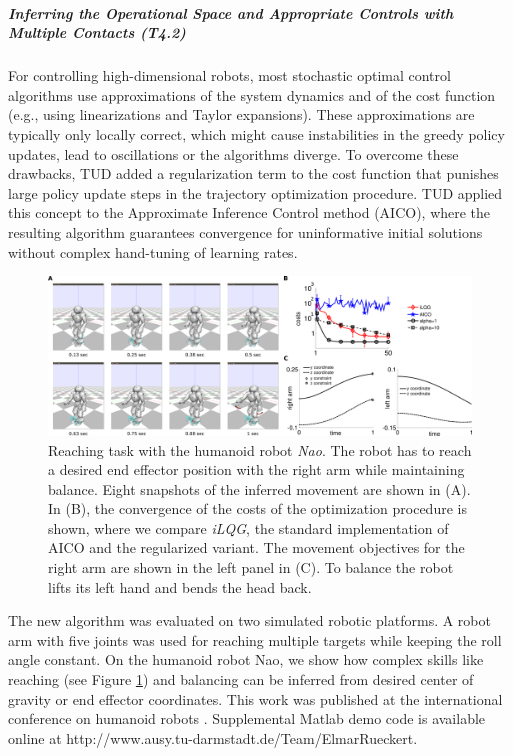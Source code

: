 \subparagraph{Inferring the Operational Space and Appropriate Controls with Multiple Contacts (T4.2)}%

For controlling high-dimensional robots, most stochastic optimal control
algorithms use approximations of the system dynamics and of the cost function
(e.g., using linearizations and Taylor expansions). These approximations are
typically only locally correct, which might cause instabilities in the greedy
policy updates, lead to oscillations or the algorithms diverge. To overcome
these drawbacks, TUD added a regularization term to the cost function that punishes
large policy update steps in the trajectory optimization procedure. TUD applied
this concept to the Approximate Inference Control method (AICO), where the
resulting algorithm guarantees convergence for uninformative initial solutions
without complex hand-tuning of learning rates. 

\begin{figure}[t]
  \begin{center}
  \includegraphics[width=\textwidth]{./sections/WP4/pics_elmar/NaoReachingTask.png}
  \end{center}
  \caption{Reaching task with the humanoid robot \textit{Nao}. The robot has to
reach  a desired end effector position with the right arm while maintaining
balance. Eight snapshots of the inferred movement are shown in (A). In (B), the
convergence of the costs of the optimization procedure is shown, where we
compare \textit{iLQG}, the standard implementation of AICO and the regularized
variant. The movement objectives for the right arm are shown in the left panel
in (C). To balance the robot lifts its left hand and bends the head back.}
  \label{fig:naoReachingTask}
  \end{figure}

The new algorithm was evaluated on
two simulated robotic platforms. A robot arm with five joints was used for
reaching multiple targets while keeping the roll angle constant. On the humanoid
robot Nao, we show how complex skills like reaching (see Figure \ref{fig:naoReachingTask}) and balancing can be
inferred from desired center of gravity or end effector coordinates. This work was published at 
the international conference on humanoid robots \cite{Rueckert2014}. 
Supplemental Matlab demo code is available online at http://www.ausy.tu-darmstadt.de/Team/ElmarRueckert.


